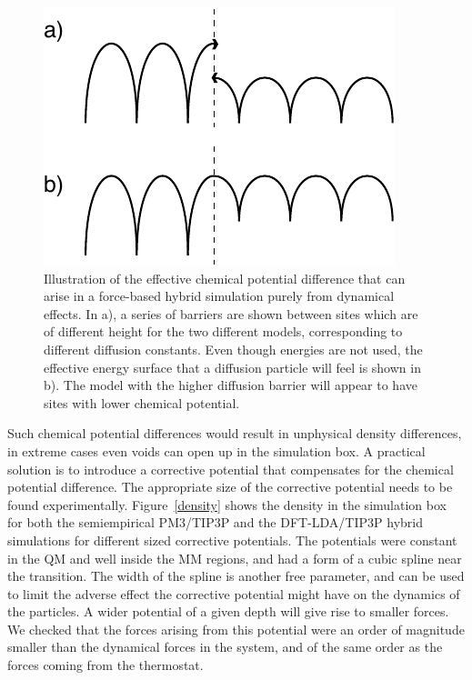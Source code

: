 \documentclass[11pt]{revtex4}
\begin{document}
\begin{figure}
\includegraphics{diffusion}
\caption{Illustration of the effective chemical potential difference that can arise in a force-based hybrid simulation purely from dynamical effects. In a), a series of barriers are shown between sites which are of different height for the two different models, corresponding to different diffusion constants. Even though energies are not used, the effective energy surface that a diffusion particle will feel is shown in b). The model with the higher diffusion barrier will appear to have sites with lower chemical potential. }
\label{diffusion_sketch}
\end{figure}

Such chemical potential differences would result in unphysical density differences, in extreme cases even voids can open up in the simulation box. A practical solution is to introduce a corrective potential that compensates for the chemical potential difference. The appropriate size of the corrective potential needs to be found experimentally. Figure~\ref{density} shows the density in the simulation box for both the semiempirical PM3/TIP3P and the DFT-LDA/TIP3P hybrid simulations for different sized corrective potentials. The potentials were constant in the QM and well inside the MM regions, and had a form of a cubic spline near the transition. The width of the spline is another free parameter, and can be used to limit the adverse effect the corrective potential might have on the dynamics of the particles. A wider potential of a given depth will give rise to smaller forces. We checked that the forces arising from this potential were an order of magnitude smaller than the dynamical forces in the system, and of the same order as the forces coming from the thermostat.  
\end{document}

